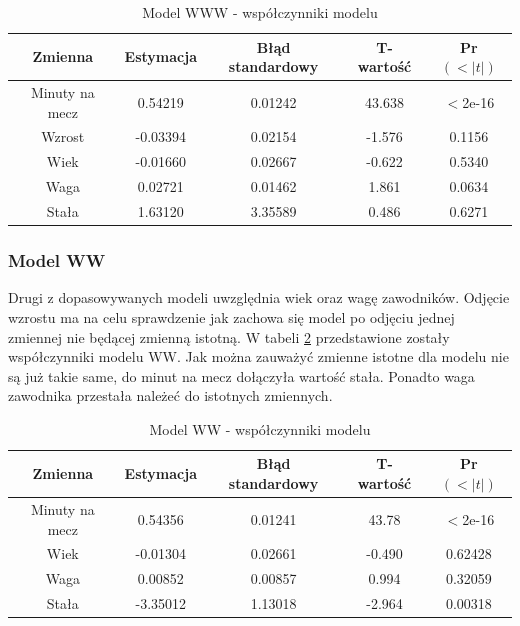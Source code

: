 \documentclass[11pt,a4paper]{article}
\begin{document}
\begin{table}[H]
	\begin{tabular}{| c | c | c | c | c |}
		\hline
		Zmienna & Estymacja & Błąd standardowy & T-wartość & Pr$(<|t|)$\\ \hline
		Minuty na mecz & 0.54219 & 0.01242 & 43.638 & $<$2e-16\\ \hline
		Wzrost & -0.03394 & 0.02154 & -1.576 & 0.1156\\ \hline
		Wiek & -0.01660 & 0.02667 & -0.622 & 0.5340\\ \hline 
		Waga & 0.02721 & 0.01462 & 1.861 & 0.0634\\ \hline
		Stała & 1.63120 & 3.35589 & 0.486 & 0.6271 \\ \hline
	\end{tabular}
	\caption{Model WWW - współczynniki modelu}
	\label{model_www}
\end{table}

\subsubsection{Model WW}
Drugi z dopasowywanych modeli uwzględnia wiek oraz wagę zawodników. Odjęcie wzrostu ma na celu sprawdzenie jak zachowa się model po odjęciu jednej zmiennej nie będącej zmienną istotną. W tabeli \ref{model_ww} przedstawione zostały współczynniki modelu WW. Jak można zauważyć zmienne istotne dla modelu nie są już takie same, do minut na mecz dołączyła wartość stała. Ponadto waga zawodnika przestała należeć do istotnych zmiennych.

\begin{table}[H]
	\begin{tabular}{| c | c | c | c | c |}
		\hline
		Zmienna & Estymacja & Błąd standardowy & T-wartość & Pr$(<|t|)$\\ \hline
		Minuty na mecz & 0.54356 & 0.01241 & 43.78 & $<$2e-16\\ \hline
		Wiek & -0.01304 & 0.02661 & -0.490 & 0.62428 \\ \hline 
		Waga & 0.00852 & 0.00857 & 0.994 & 0.32059\\ \hline
		Stała & -3.35012 & 1.13018 & -2.964 & 0.00318\\ \hline
	\end{tabular}
	\caption{Model WW - współczynniki modelu}
	\label{model_ww}
\end{table}
\end{document}
